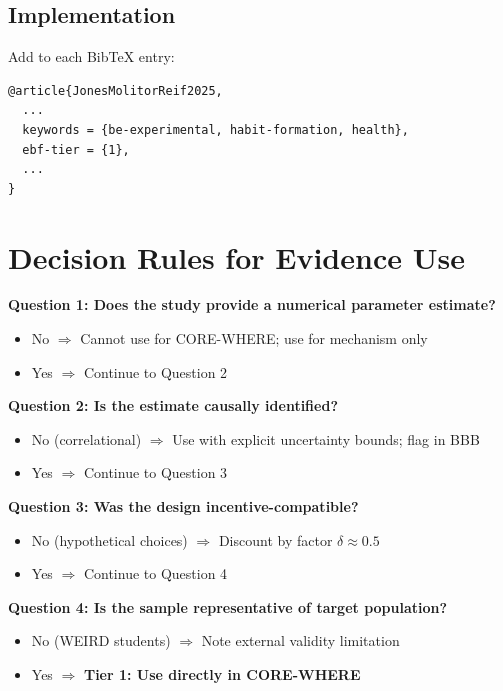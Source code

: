 \documentclass[11pt, a4paper]{article}
\begin{document}
\subsection{Implementation}

Add to each BibTeX entry:
\begin{verbatim}
@article{JonesMolitorReif2025,
  ...
  keywords = {be-experimental, habit-formation, health},
  ebf-tier = {1},
  ...
}
\end{verbatim}


\section{Decision Rules for Evidence Use}
\label{sec:evd-rules}

\begin{tcolorbox}[colback=green!10!white, colframe=green!75!black,
    title=Evidence Use Decision Tree]

\textbf{Question 1: Does the study provide a numerical parameter estimate?}
\begin{itemize}[nosep]
    \item No $\Rightarrow$ Cannot use for CORE-WHERE; use for mechanism only
    \item Yes $\Rightarrow$ Continue to Question 2
\end{itemize}

\textbf{Question 2: Is the estimate causally identified?}
\begin{itemize}[nosep]
    \item No (correlational) $\Rightarrow$ Use with explicit uncertainty bounds; flag in BBB
    \item Yes $\Rightarrow$ Continue to Question 3
\end{itemize}

\textbf{Question 3: Was the design incentive-compatible?}
\begin{itemize}[nosep]
    \item No (hypothetical choices) $\Rightarrow$ Discount by factor $\delta \approx 0.5$
    \item Yes $\Rightarrow$ Continue to Question 4
\end{itemize}

\textbf{Question 4: Is the sample representative of target population?}
\begin{itemize}[nosep]
    \item No (WEIRD students) $\Rightarrow$ Note external validity limitation
    \item Yes $\Rightarrow$ \textbf{Tier 1: Use directly in CORE-WHERE}
\end{itemize}

\end{tcolorbox}
\end{document}
